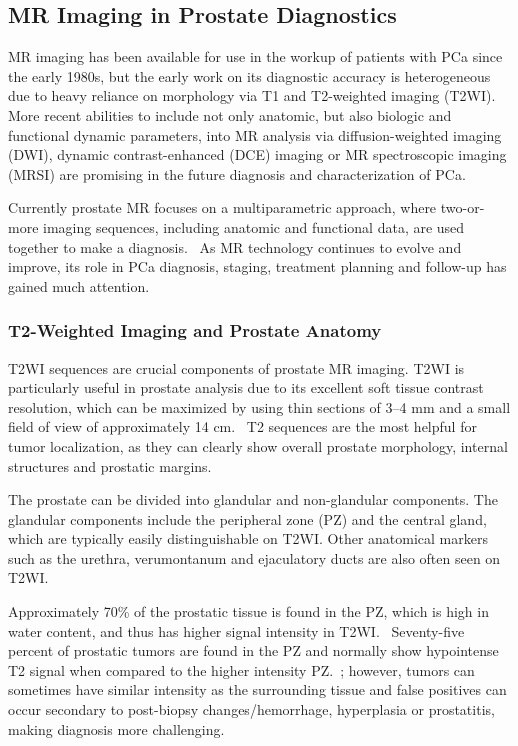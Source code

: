 ﻿\subsection{MR Imaging in Prostate Diagnostics}
MR imaging has been available for use in the workup of patients with PCa since
the early 1980s, but the early work on its diagnostic accuracy is heterogeneous
due to heavy reliance on morphology via T1 and T2-weighted imaging (T2WI). More
recent abilities to include not only anatomic, but also biologic and functional
dynamic parameters, into MR analysis via diffusion-weighted imaging (DWI),
dynamic contrast-enhanced (DCE) imaging or MR spectroscopic imaging (MRSI) are
promising in the future diagnosis and characterization of PCa.

Currently prostate MR focuses on a multiparametric approach, where two-or-more
imaging sequences, including anatomic and functional data, are used together to
make a diagnosis.~\cite{Barentsz2012} As MR technology continues to evolve and
improve, its role in PCa diagnosis, staging, treatment planning and follow-up
has gained much attention.

\subsubsection{T2-Weighted Imaging and Prostate Anatomy}
T2WI sequences are crucial components of prostate MR imaging.  T2WI is
particularly useful in prostate analysis due to its excellent soft tissue
contrast resolution, which can be maximized by using thin sections of 3--4 mm
and a small field of view of approximately 14 cm.~\cite{Gupta2013,Bonekamp2011}
T2 sequences are the most helpful for tumor localization, as they can clearly
show overall prostate morphology, internal structures and prostatic
margins.~\cite{Gupta2013}

The prostate can be divided into glandular and non-glandular components. The
glandular components include the peripheral zone (PZ) and the central gland,
which are typically easily distinguishable on T2WI.  Other anatomical markers
such as the urethra, verumontanum and ejaculatory ducts are also often seen on
T2WI. 

Approximately 70\% of the prostatic tissue is found in the PZ, which is high in
water content, and thus has higher signal intensity in T2WI.~\cite{Jung2012}
Seventy-five percent of prostatic tumors are found in the PZ and normally show
hypointense T2 signal when compared to the higher intensity
PZ.~\cite{Hricak2007,Hegde2013}; however, tumors can sometimes have similar
intensity as the surrounding tissue and false positives can occur secondary to
post-biopsy changes/hemorrhage, hyperplasia or prostatitis, making diagnosis
more challenging.~\cite{Hegde2013}

